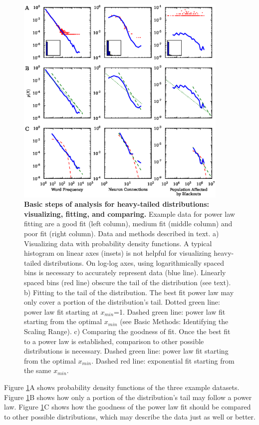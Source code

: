 \documentclass[10pt]{article}
\begin{document}
\begin{figure}[!ht]
\begin{center}
\includegraphics[width=4in]{FigWorkflow.eps}
\end{center}
\caption{
{\bf Basic steps of analysis for heavy-tailed distributions: visualizing, fitting, and comparing.} Example data for power law fitting are a good fit (left column), medium fit (middle column) and poor fit (right column). Data and methods described in text.
a) Visualizing data with probability density functions. A typical histogram on linear axes (insets) is not helpful for visualizing heavy-tailed distributions. On log-log axes, using logarithmically spaced bins is necessary to accurately represent data (blue line). Linearly spaced bins (red line) obscure the tail of the distribution (see text).
b) Fitting to the tail of the distribution. The best fit power law may only cover a portion of the distribution's tail. Dotted green line: power law fit starting at $x_{min}$=1. Dashed green line: power law fit starting from the optimal $x_{min}$ (see Basic Methods: Identifying the Scaling Range). 
c) Comparing the goodness of fit. Once the best fit to a power law is established, comparison to other possible distributions is necessary.  Dashed green line: power law fit starting from the optimal $x_{min}$. Dashed red line: exponential fit starting from the same $x_{min}$.
}
\label{Workflow}
\end{figure}

Figure \ref{Workflow}A shows probability density functions of the three example datasets. Figure \ref{Workflow}B shows how only a portion of the distribution's tail may follow a power law. Figure \ref{Workflow}C shows how the goodness of the power law fit should be compared to other possible distributions, which may describe the data just as well or better.
\end{document}
